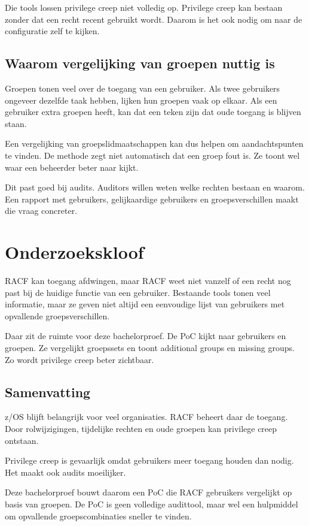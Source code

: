 Die tools lossen privilege creep niet volledig op. Privilege creep kan bestaan zonder dat een recht recent gebruikt wordt. Daarom is het ook nodig om naar de configuratie zelf te kijken.

\subsection*{Waarom vergelijking van groepen nuttig is}

Groepen tonen veel over de toegang van een gebruiker. Als twee gebruikers ongeveer dezelfde taak hebben, lijken hun groepen vaak op elkaar. Als een gebruiker extra groepen heeft, kan dat een teken zijn dat oude toegang is blijven staan.

Een vergelijking van groepslidmaatschappen kan dus helpen om aandachtspunten te vinden. De methode zegt niet automatisch dat een groep fout is. Ze toont wel waar een beheerder beter naar kijkt.

Dit past goed bij audits. Auditors willen weten welke rechten bestaan en waarom. Een rapport met gebruikers, gelijkaardige gebruikers en groepsverschillen maakt die vraag concreter.

\section{Onderzoekskloof}

RACF kan toegang afdwingen, maar RACF weet niet vanzelf of een recht nog past bij de huidige functie van een gebruiker. Bestaande tools tonen veel informatie, maar ze geven niet altijd een eenvoudige lijst van gebruikers met opvallende groepsverschillen.

Daar zit de ruimte voor deze bachelorproef. De PoC kijkt naar gebruikers en groepen. Ze vergelijkt groepssets en toont additional groups en missing groups. Zo wordt privilege creep beter zichtbaar.

\subsection*{Samenvatting}

z/OS blijft belangrijk voor veel organisaties. RACF beheert daar de toegang. Door rolwijzigingen, tijdelijke rechten en oude groepen kan privilege creep ontstaan.

Privilege creep is gevaarlijk omdat gebruikers meer toegang houden dan nodig. Het maakt ook audits moeilijker.

Deze bachelorproef bouwt daarom een PoC die RACF gebruikers vergelijkt op basis van groepen. De PoC is geen volledige audittool, maar wel een hulpmiddel om opvallende groepscombinaties sneller te vinden.
